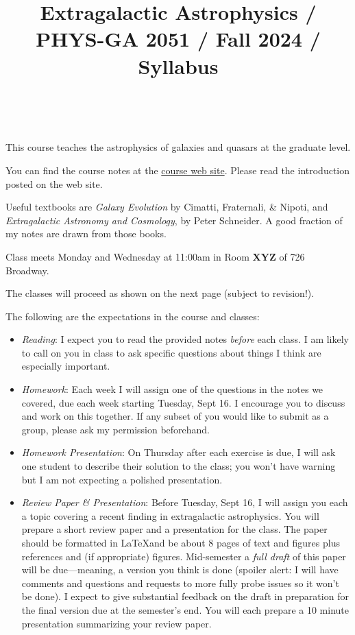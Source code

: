 \documentclass[11pt, preprint]{aastex}
\begin{document}
\title{\bf Extragalactic Astrophysics / PHYS-GA 2051 / Fall 2024 / Syllabus }

~

\noindent This course teaches the astrophysics of galaxies and quasars
at the graduate level.

\noindent You can find the course notes at the
\href{http://blanton144.github.io/exex}{course web site}. Please read
the introduction posted on the web site.

\noindent Useful textbooks are {\it Galaxy Evolution} by Cimatti,
Fraternali, \& Nipoti, and {\it Extragalactic Astronomy and
  Cosmology}, by Peter Schneider. A good fraction of my notes are
drawn from those books.

\noindent Class meets Monday and Wednesday at 11:00am in Room {\bf
  XYZ} of 726 Broadway.

\noindent The classes will proceed as shown on the next page (subject
to revision!).

\noindent The following are the expectations in the course and
classes:

\begin{itemize}

\item {\it Reading}: I expect you to read the provided notes {\it
  before} each class. I am likely to call on you in class to ask 
  specific questions about things I think are especially important.

\item {\it Homework}: Each week I will assign one of the questions in
  the notes we covered, due each week starting Tuesday, Sept 16. I
  encourage you to discuss and work on this together. If any subset of
  you would like to submit as a group, please ask my permission
  beforehand.

\item {\it Homework Presentation}: On Thursday after each exercise is
  due, I will ask one student to describe their solution to the class;
  you won't have warning but I am not expecting a polished
  presentation.

\item {\it Review Paper \& Presentation}: Before Tuesday, Sept 16, I
  will assign you each a topic covering a recent finding in
  extragalactic astrophysics. You will prepare a short review paper
  and a presentation for the class. The paper should be formatted in
  \LaTeX and be about 8 pages of text and figures plus references and
  (if appropriate) figures. Mid-semester a {\it full draft} of this
  paper will be due---meaning, a version you think is done (spoiler
  alert: I will have comments and questions and requests to more fully
  probe issues so it won't be done). I expect to give substantial
  feedback on the draft in preparation for the final version due at
  the semester's end. You will each prepare a 10 minute presentation
  summarizing your review paper.

\end{itemize}
\end{document}
